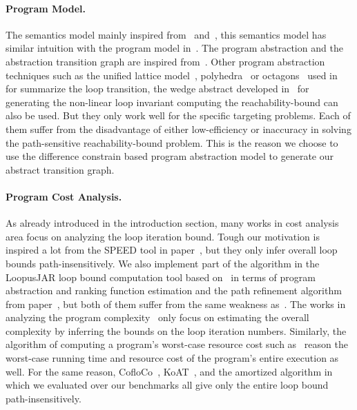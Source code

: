 
\paragraph*{Program Model.}
The semantics model mainly inspired from~\cite{Cousot19a} and~\cite{Cousot19}, this semantics model has similar intuition with the program model in~\cite{SinnZV17}.
The program abstraction and the abstraction transition graph are inspired from~\cite{SinnZV17}.
Other program abstraction techniques such as the unified lattice model~\cite{CousotH78}, polyhedra~\cite{CousotC77} or octagons~\cite{Mine06} used in~\cite{GulwaniZ10} for summarize the loop transition,
the wedge abstract developed in~\cite{KincaidCBR18} for generating the non-linear loop invariant
computing the reachability-bound can also be used. But they only work well for the specific targeting problems. 
Each of them suffer from the disadvantage of either low-efficiency or inaccuracy in solving the path-sensitive reachability-bound problem. This is the reason we choose to use the difference constrain based program abstraction model to generate our abstract transition graph.

\paragraph{Program Cost Analysis.}
As already introduced in the introduction section, many works in cost analysis area focus on analyzing the loop iteration bound.
Tough our motivation is inspired a lot from the SPEED tool in paper~\cite{GulwaniZ10}, but they only infer overall loop bounds path-insensitively.
We also implement part of the algorithm in the LoopusJAR loop bound computation tool based on~\cite{SinnZV17} in terms of program abstraction and ranking function estimation
and the path refinement algorithm from paper~\cite{GulwaniJK09}, but both of them suffer from the same weakness as~\cite{GulwaniZ10}.
The works in analyzing the program complexity~\cite{GustafssonEL05, HumenbergerJK18} only focus on estimating 
the overall complexity 
by inferring the bounds on the loop iteration numbers.
Similarly, the algorithm of computing a program's worst-case resource cost
such as~\cite{AlbertAGP08, AliasDFG10} reason the worst-case running time and resource cost of the program's entire execution as well.
For the same reason, CofloCo~\cite{Montoya17, Flores-MontoyaH14, Flores-Montoya16}, KoAT~\cite{BrockschmidtEFFG16, BrockschmidtEFFG14, FalkeKS12, FalkeKS11}, and the amortized algorithm in~\cite{LuCT21} which we evaluated over our benchmarks all give only the entire loop bound path-insensitively.

